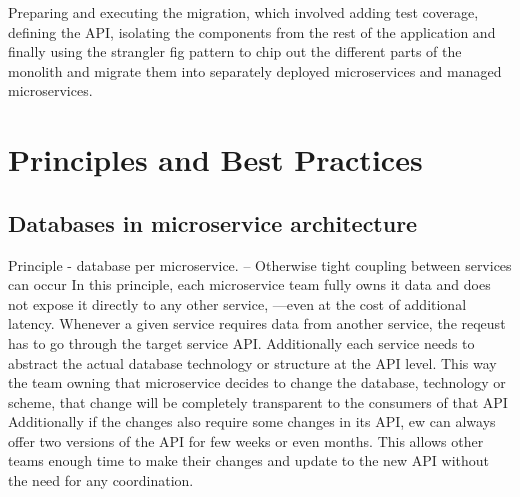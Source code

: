 \documentclass[a4paper, 11pt]{book}
\begin{document}
    Preparing and executing the migration,
    which involved adding test coverage,
    defining the API,
    isolating the components from the rest of the application and finally using the strangler fig pattern to chip out the different parts of
    the monolith and migrate them into separately deployed microservices and managed microservices.

    \section{Principles and Best Practices}

    \subsection{Databases in microservice architecture}
    Principle - database per microservice.
    -- Otherwise tight coupling between services can occur
    In this principle, each microservice team fully owns it data and does not expose it directly to any other service, ---even at the cost of additional latency.
    Whenever a given service requires data from another service, the reqeust has to go through the target service API.
    Additionally each service needs to abstract the actual database technology or structure at the API level.
    This way the team owning that microservice decides to change the database, technology or scheme, that change will be completely transparent to the consumers of that API
    Additionally if the changes also require some changes in its API, ew can always offer two versions of the API for few weeks or even months.
    This allows other teams enough time to make their changes and update to the new API without the need for any coordination.
\end{document}

